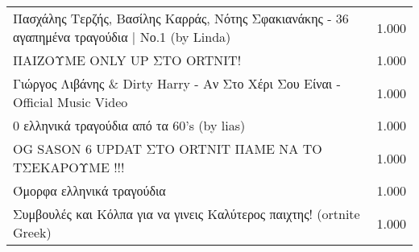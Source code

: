\begin{table}
\begin{tabular}{|p{10cm}|p{1cm}|}
Πασχάλης Τερζής, Βασίλης Καρράς, Νότης Σφακιανάκης - 36 αγαπημένα τραγούδια | Νο.1 (by Linda) & 1.000 \\
ΠΑΙΖΟΥΜΕ ONLY UP ΣΤΟ ORTNIT! & 1.000 \\
Γιώργος Λιβάνης \& Dirty Harry - Αν Στο Χέρι Σου Είναι - Official Music Video & 1.000 \\
0 ελληνικά τραγούδια από τα 60's (by lias) & 1.000 \\
OG SASON 6 UPDAT ΣΤΟ ORTNIT ΠΑΜΕ ΝΑ ΤΟ ΤΣΕΚΑΡΟΥΜΕ !!! & 1.000 \\
Όμορφα ελληνικά τραγούδια & 1.000 \\
Συμβουλές και Κόλπα για να γινεις Καλύτερος παιχτης! (ortnite Greek) & 1.000 \\
\bottomrule
\end{tabular}
\end{table}
